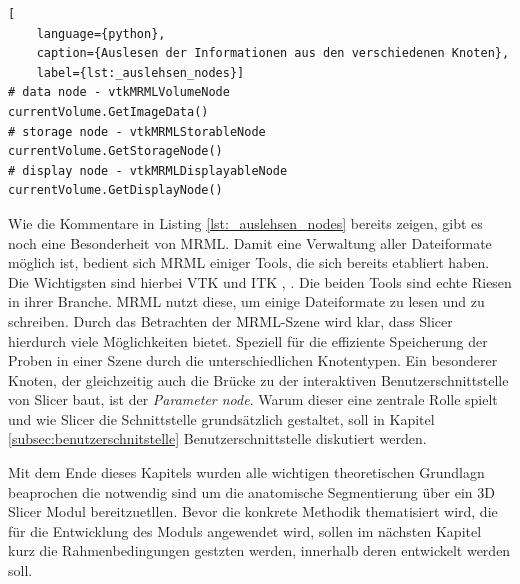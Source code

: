 \begin{lstlisting}[
	language={python},
	caption={Auslesen der Informationen aus den verschiedenen Knoten},
	label={lst:_auslehsen_nodes}]
# data node - vtkMRMLVolumeNode
currentVolume.GetImageData()
# storage node - vtkMRMLStorableNode
currentVolume.GetStorageNode()
# display node - vtkMRMLDisplayableNode
currentVolume.GetDisplayNode()
\end{lstlisting}

Wie die Kommentare in Listing \ref{lst:_auslehsen_nodes} bereits zeigen, gibt es
noch eine Besonderheit von \ac{MRML}. Damit eine Verwaltung aller Dateiformate
möglich ist, bedient sich \ac{MRML} einiger Tools, die sich bereits etabliert haben.
Die Wichtigsten sind hierbei \ac{VTK} und \ac{ITK} \citep[vgl.][K.~1.1]{vtk2006},
\citep[vgl.][K.~1.1]{itkguide2015}. Die beiden Tools sind echte Riesen in ihrer
Branche. \ac{MRML} nutzt diese, um einige Dateiformate zu lesen und zu schreiben.
Durch das Betrachten der \ac{MRML}-Szene wird klar, dass Slicer hierdurch viele
Möglichkeiten bietet. Speziell für die effiziente Speicherung der Proben in einer
Szene durch die unterschiedlichen Knotentypen. Ein besonderer Knoten, der gleichzeitig
auch die Brücke zu der interaktiven Benutzerschnittstelle von Slicer baut, ist
der \textit{Parameter node}. Warum dieser eine zentrale Rolle spielt und wie
Slicer die Schnittstelle grundsätzlich gestaltet, soll in Kapitel \ref{subsec:benutzerschnitstelle}
Benutzerschnittstelle diskutiert werden.

Mit dem Ende dieses Kapitels wurden alle wichtigen theoretischen Grundlagn beaprochen
die notwendig sind um die anatomische Segmentierung über ein 3D Slicer Modul bereitzuetllen.
Bevor die konkrete Methodik thematisiert wird, die für die Entwicklung des Moduls
angewendet wird, sollen im nächsten Kapitel kurz die Rahmenbedingungen gestzten
werden, innerhalb deren entwickelt werden soll.
